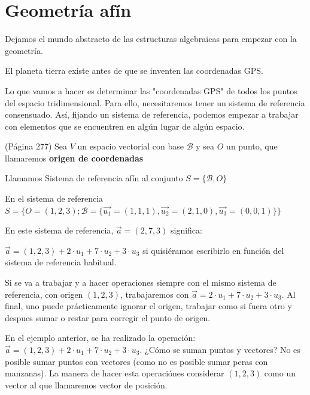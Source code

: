 
\section{Geometría afín}

Dejamos el mundo abstracto de las estructuras algebraicas para empezar con la geometría. 

El planeta tierra existe antes de que se inventen las coordenadas GPS. 


Lo que vamos a hacer es determinar las "coordenadas GPS" de todos los puntos del espacio tridimensional.
%
Para ello, necesitaremos tener un sistema de referencia consensuado.
%
Así, fijando un sistema de referencia, podemos empezar a trabajar con elementos que se encuentren en algún lugar de algún espacio. 



\begin{defn} (Página 277)
Sea $V$ un espacio vectorial con base $\mathcal{B}$ y sea $O$ un punto, que llamaremos \textbf{origen de coordenadas}

Llamamos Sistema de referencia afín al conjunto $S = \{\mathcal{B},O\}$
\end{defn}

\begin{example}
En el sistema de referencia $S=\{O = (1,2,3); \mathcal{B} = \{\vec{u_1} = (1,1,1), \vec{u_2} = (2,1,0), \vec{u_3} = (0,0,1)\}\}$

En este sistema de referencia, $\vec{a} = (2,7,3)$ significa:

$\vec{a} =  (1,2,3) + 2\cdot u_1 + 7\cdot u_2 + 3\cdot u_3$ si quisiéramos escribirlo en función del sistema de referencia habitual.

\label{example::origen_ref}

Si se va a trabajar y a hacer operaciones siempre con el mismo sistema de referencia, con origen $(1,2,3)$, trabajaremos con $\vec{a} = 2\cdot u_1 + 7\cdot u_2 + 3\cdot u_3$.
%
Al final, uno puede prácticamente ignorar el origen, trabajar como si fuera otro y despues sumar o restar para corregir el punto de origen.

\end{example}

\obs En el ejemplo anterior, se ha realizado la operación: $\vec{a} =  (1,2,3) + 2·u_1 + 7·u_2 + 3·u_3$. ¿Cómo se suman puntos y vectores? 
%
No es posible sumar puntos con vectores (como no es posible sumar peras con manzanas). La manera de hacer esta operaciónes considerar $(1,2,3)$ como un vector al que llamaremos vector de posición.


